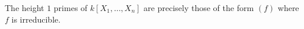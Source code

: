The height $1$ primes of $k[X_1, \ldots, X_n]$ are precisely those of
the form $(f)$ where $f$ is irreducible.
